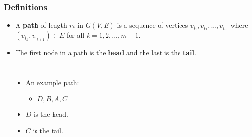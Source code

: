 \documentclass{beamer}
\begin{document}
\begin{frame}
\frametitle{Definitions}

\begin{itemize}
\item A \textbf{path} of length $m$ in $G(V,E)$ is a sequence of vertices $v_{i_1},v_{i_2},...,v_{i_m}$ where $(v_{i_k},v_{i_{k+1}}) \in E$ for all $k = 1, 2, ... , m-1$.
\item The first node in a path is the \textbf{head} and the last is the \textbf{tail}.
\end{itemize}
\begin{columns}[c]

\begin{center}
\end{center}
\begin{itemize}
\item An example path:
\begin{itemize}
\item $D, B, A, C$
\end{itemize}
\item $D$ is the head.
\item $C$ is the tail.

\end{itemize}

\end{columns}
\end{frame}
\end{document}

